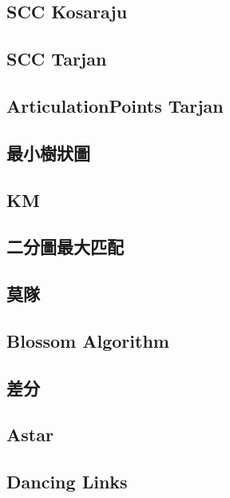     \subsection{SCC Kosaraju}
         \columnbreak
    \subsection{SCC Tarjan}
         \columnbreak
    \subsection{ArticulationPoints Tarjan}
         \columnbreak
    \subsection{最小樹狀圖}
         \columnbreak
    \subsection{KM}
        
    \subsection{二分圖最大匹配}
        
    \subsection{莫隊}
         \columnbreak
    \subsection{Blossom Algorithm}
        
    \subsection{差分}
         \columnbreak
    \subsection{Astar}
        
    \subsection{Dancing Links}
         \columnbreak
